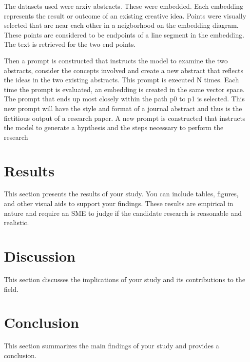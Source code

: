 \documentclass[twocolumn]{article}
\begin{document}
The datasets used were arxiv abstracts.   These were embedded.   Each embedding represents the result or outcome of an existing creative idea.  Points were visually selected that are near each other
in a neigborhood on the embedding diagram.   These points are considered to be endpoints of a line segment in the embedding.   The text is retrieved for the two end points.

Then a prompt is constructed that instructs the model to examine the two abstracts, consider the concepts involved and create a new abstract that reflects the ideas in the two existing abstracts.   This 
prompt is executed N times.  Each time the prompt is evaluated, an embedding is created in the same vector space.   The prompt that ends up most closely within the path p0 to p1 is selected.   This new prompt will 
have the style and format of a journal abstract and thus is the fictitious output of a research paper.   A new prompt is constructed that instructs the model to generate a hypthesis and the steps necessary 
to perform the research


\section{Results}
This section presents the results of your study. You can include tables, figures, and other visual aids to support your findings.
These results are empirical in nature and require an SME to judge if the candidate research is reasonable and realistic.

\section{Discussion}
This section discusses the implications of your study and its contributions to the field.

\section{Conclusion}
This section summarizes the main findings of your study and provides a conclusion.



\end{document}
